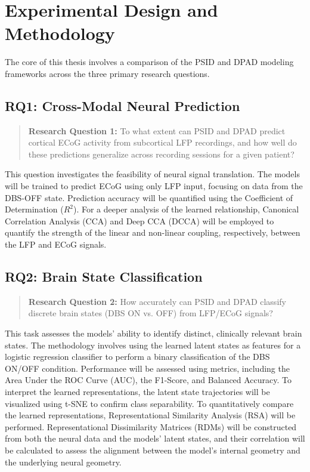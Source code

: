 \documentclass[12pt, a4paper]{article}
\begin{document}
\section{Experimental Design and Methodology}

The core of this thesis involves a comparison of the PSID and DPAD modeling frameworks across the three primary research questions. 

\subsection{RQ1: Cross-Modal Neural Prediction}
\begin{quote}
    \textbf{Research Question 1:} To what extent can PSID and DPAD predict cortical ECoG activity from subcortical LFP recordings, and how well do these predictions generalize across recording sessions for a given patient?
\end{quote}

This question investigates the feasibility of neural signal translation. The models will be trained to predict ECoG using only LFP input, focusing on data from the DBS-OFF state. Prediction accuracy will be quantified using the Coefficient of Determination ($R^2$). For a deeper analysis of the learned relationship, Canonical Correlation Analysis (CCA) and Deep CCA (DCCA) will be employed to quantify the strength of the linear and non-linear coupling, respectively, between the LFP and ECoG signals.

\subsection{RQ2: Brain State Classification}
\begin{quote}
    \textbf{Research Question 2:} How accurately can PSID and DPAD classify discrete brain states (DBS ON vs. OFF) from LFP/ECoG signals?
\end{quote}

This task assesses the models' ability to identify distinct, clinically relevant brain states. The methodology involves using the learned latent states as features for a logistic regression classifier to perform a binary classification of the DBS ON/OFF condition. Performance will be assessed using metrics, including the Area Under the ROC Curve (AUC), the F1-Score, and Balanced Accuracy. To interpret the learned representations, the latent state trajectories will be visualized using t-SNE to confirm class separability. To quantitatively compare the learned representations, Representational Similarity Analysis (RSA) will be performed. Representational Dissimilarity Matrices (RDMs) will be constructed from both the neural data and the models' latent states, and their correlation will be calculated to assess the alignment between the model's internal geometry and the underlying neural geometry. 
\end{document}
